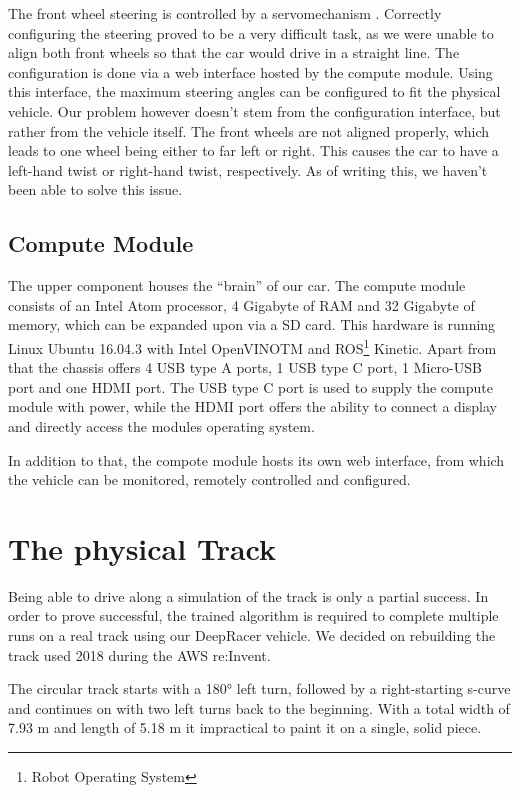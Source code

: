 The front wheel steering is controlled by a servomechanism \cite{AWS19}. Correctly configuring the steering proved to be a very difficult task, as we were unable to align both front wheels so that the car would drive in a straight line. The configuration is done via a web interface hosted by the compute module. Using this interface, the maximum steering angles can be configured to fit the physical vehicle. Our problem however doesn't stem from the configuration interface, but rather from the vehicle itself. The front wheels are not aligned properly, which leads to one wheel being either to far left or right. This causes the car to have a left-hand twist or right-hand twist, respectively. As of writing this, we haven't been able to solve this issue.

\subsection{Compute Module}
The upper component houses the ``brain'' of our car. The compute module consists of an Intel Atom
processor, 4 Gigabyte of RAM and 32 Gigabyte of memory, which can be expanded upon via a SD card. This hardware is running Linux Ubuntu 16.04.3 with Intel OpenVINO\textsc{TM} and ROS\footnote{Robot Operating System} Kinetic. Apart from that the chassis offers 4 USB type A ports, 1 USB type C port, 1 Micro-USB port and one HDMI port. The USB type C port is used to supply the compute module with power, while the HDMI port offers the ability to connect a display and directly access the modules operating system.

In addition to that, the compote module hosts its own web interface, from which the vehicle can be monitored, remotely controlled and configured.

\section{The physical Track}

Being able to drive along a simulation of the track is only a partial success. In order to prove successful, the trained algorithm is required to complete multiple runs on a real track using our DeepRacer vehicle. We decided on rebuilding the track used 2018 during the AWS re:Invent.

The circular track starts with a 180° left turn, followed by a right-starting s-curve and continues on with two left turns back to the beginning. With a total width of 7.93 m and length of 5.18 m it impractical to paint it on a single, solid piece.


